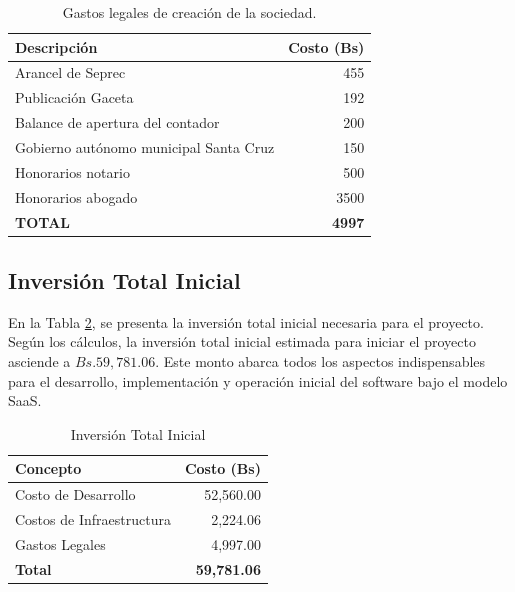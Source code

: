 \begin{table}[ht]
    \centering
    \begin{tabularx}{\textwidth}{|X|r|} 
        \hline
        \textbf{Descripción} & \textbf{Costo (Bs)} \\ \hline
        Arancel de Seprec & 455 \\ 
        Publicación Gaceta & 192 \\ 
        Balance de apertura del contador & 200 \\ 
        Gobierno autónomo municipal Santa Cruz & 150 \\ 
        Honorarios notario & 500 \\ 
        Honorarios abogado & 3500 \\ \hline
        \textbf{TOTAL} & \textbf{4997} \\ \hline
    \end{tabularx}
    \caption{Gastos legales de creación de la sociedad.}
    \label{tab:costos_legales}
\end{table}

\subsection{Inversión Total Inicial}

En la Tabla \ref{tab:inversion_total}, se presenta la inversión total inicial necesaria para el proyecto. Según los cálculos, la inversión total inicial estimada para iniciar el proyecto asciende a $Bs.59,781.06$. Este monto abarca todos los aspectos indispensables para el desarrollo, implementación y operación inicial del software bajo el modelo SaaS.

\begin{table}[ht]
    \centering
    \begin{tabularx}{\textwidth}{|X|r|}
        \hline
        \textbf{Concepto} & \textbf{Costo (Bs)} \\
        \hline
        Costo de Desarrollo & 52,560.00 \\
        Costos de Infraestructura & 2,224.06 \\
        Gastos Legales & 4,997.00 \\
        \hline
        \textbf{Total} & \textbf{59,781.06} \\
        \hline
    \end{tabularx}
    \caption{Inversión Total Inicial}
    \label{tab:inversion_total}
\end{table}

